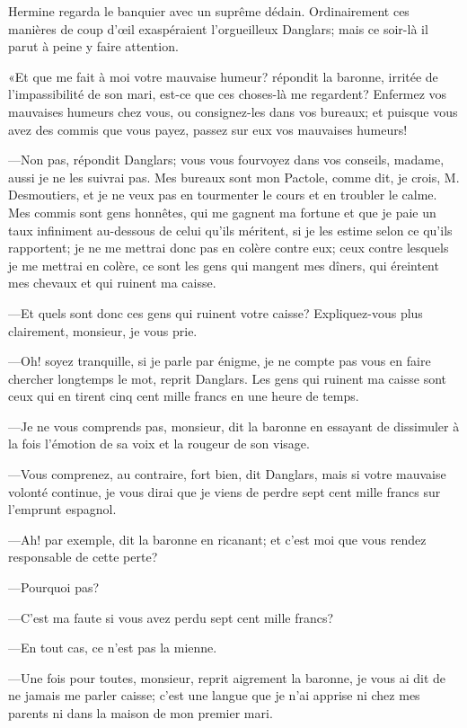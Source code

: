 Hermine regarda le banquier avec un suprême dédain. Ordinairement ces manières de coup d'œil exaspéraient l'orgueilleux Danglars; mais ce soir-là il parut à peine y faire attention. 

«Et que me fait à moi votre mauvaise humeur? répondit la baronne, irritée de l'impassibilité de son mari, est-ce que ces choses-là me regardent? Enfermez vos mauvaises humeurs chez vous, ou consignez-les dans vos bureaux; et puisque vous avez des commis que vous payez, passez sur eux vos mauvaises humeurs! 

—Non pas, répondit Danglars; vous vous fourvoyez dans vos conseils, madame, aussi je ne les suivrai pas. Mes bureaux sont mon Pactole, comme dit, je crois, M. Desmoutiers, et je ne veux pas en tourmenter le cours et en troubler le calme. Mes commis sont gens honnêtes, qui me gagnent ma fortune et que je paie un taux infiniment au-dessous de celui qu'ils méritent, si je les estime selon ce qu'ils rapportent; je ne me mettrai donc pas en colère contre eux; ceux contre lesquels je me mettrai en colère, ce sont les gens qui mangent mes dîners, qui éreintent mes chevaux et qui ruinent ma caisse. 

—Et quels sont donc ces gens qui ruinent votre caisse? Expliquez-vous plus clairement, monsieur, je vous prie. 

—Oh! soyez tranquille, si je parle par énigme, je ne compte pas vous en faire chercher longtemps le mot, reprit Danglars. Les gens qui ruinent ma caisse sont ceux qui en tirent cinq cent mille francs en une heure de temps. 

—Je ne vous comprends pas, monsieur, dit la baronne en essayant de dissimuler à la fois l'émotion de sa voix et la rougeur de son visage.  

—Vous comprenez, au contraire, fort bien, dit Danglars, mais si votre mauvaise volonté continue, je vous dirai que je viens de perdre sept cent mille francs sur l'emprunt espagnol. 

—Ah! par exemple, dit la baronne en ricanant; et c'est moi que vous rendez responsable de cette perte? 

—Pourquoi pas? 

—C'est ma faute si vous avez perdu sept cent mille francs? 

—En tout cas, ce n'est pas la mienne. 

—Une fois pour toutes, monsieur, reprit aigrement la baronne, je vous ai dit de ne jamais me parler caisse; c'est une langue que je n'ai apprise ni chez mes parents ni dans la maison de mon premier mari. 

